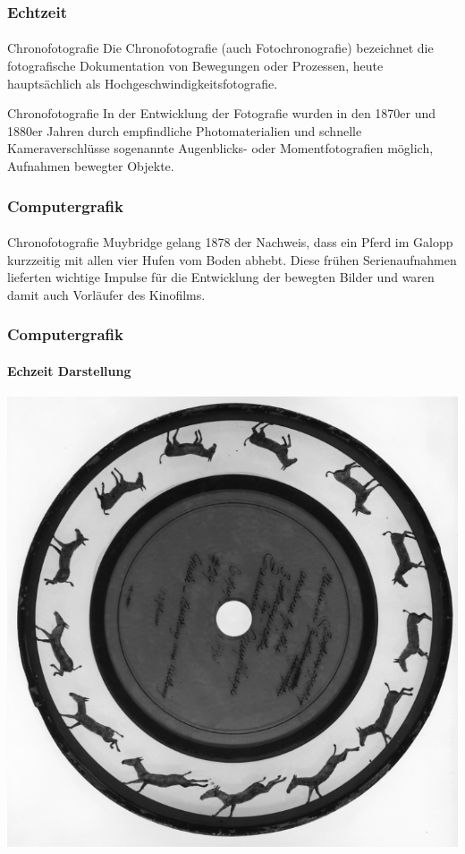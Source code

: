 \documentclass{beamer}
\begin{document}
  \begin{frame}
    \frametitle{Echtzeit}
\framesubtitle{}
    \begin{block}{Chronofotografie}
        Die Chronofotografie (auch Fotochronografie) bezeichnet die fotografische Dokumentation von Bewegungen oder Prozessen, heute hauptsächlich als Hochgeschwindigkeitsfotografie. 
\end{block}

\begin{block}{Chronofotografie}
    In der Entwicklung der Fotografie wurden in den 1870er und 1880er Jahren durch empfindliche Photomaterialien und schnelle Kameraverschlüsse sogenannte Augenblicks- oder Momentfotografien möglich, Aufnahmen bewegter Objekte.
\end{block}
\end{frame}


\begin{frame}
    \frametitle{Computergrafik}
\framesubtitle{}
    \begin{block}{Chronofotografie}
        Muybridge gelang 1878 der Nachweis, dass ein Pferd im Galopp kurzzeitig mit allen vier Hufen vom Boden abhebt. Diese frühen Serienaufnahmen lieferten wichtige Impulse für die Entwicklung der bewegten Bilder und waren damit auch Vorläufer des Kinofilms. 
    \end{block}
\end{frame}


\begin{frame}
    \frametitle{Computergrafik}
\framesubtitle{Echzeit Darstellung}
 
\begin{center}
\includegraphics[scale=0.56]{images/Zoopraxiscope.jpg}
\end{center}
\end{frame}
\end{document}
